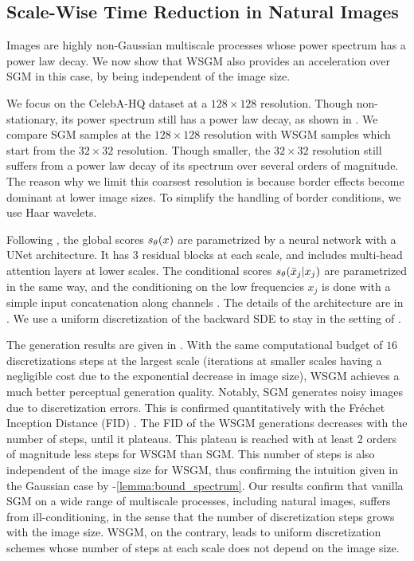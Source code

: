\documentclass{article}
\begin{document}
\subsection{Scale-Wise Time Reduction in Natural Images }

Images are highly non-Gaussian multiscale processes whose power spectrum has a power law decay. We now show that WSGM also provides an acceleration over SGM in this case, by being independent of the image size. 

We focus on the CelebA-HQ dataset \citep{liu2015faceattributes} at a $128\times 128$ resolution. Though non-stationary, its power spectrum still has a power law decay, as shown in . We compare SGM \cite{ho2020denoising} samples at the $128 \times 128$ resolution with WSGM samples which start from the $32 \times 32$ resolution. Though smaller, the $32 \times 32$ resolution still suffers from a power law decay of its spectrum over several orders of magnitude. The reason why we limit this coarsest resolution is because border effects become dominant at lower image sizes. To simplify the handling of border conditions, we use Haar wavelets. 

Following \cite{nichol2021improved}, the global scores ${s}_\theta(x)$ are parametrized by a neural network with a UNet architecture. It has 3 residual blocks at each scale, and includes multi-head attention layers at lower scales. The conditional scores ${s}_\theta(\bar x_j | x_j)$ are parametrized in the same way, and the conditioning on the low frequencies $x_j$ is done with a simple input concatenation along channels  \citep{nichol2021improved,saharia2021image}. The details of the architecture are in . We use a uniform discretization of the backward SDE to stay in the setting of . 

The generation results are given in . With the same computational budget of $16$ discretizations steps at the largest scale (iterations at smaller scales having a negligible cost due to the exponential decrease in image size), WSGM achieves a much better perceptual generation quality. Notably, SGM generates noisy images due to discretization errors. This is confirmed quantitatively with the Fréchet Inception Distance (FID) \citep{fid}. The FID of the WSGM generations decreases with the number of steps, until it plateaus. This plateau is reached with at least 2 orders of magnitude less steps for WSGM than SGM. This number of steps is also independent of the image size for WSGM, thus confirming the intuition given in the Gaussian case by -\ref{lemma:bound_spectrum}. Our results confirm that vanilla SGM on a wide range of multiscale processes, including natural images, suffers from ill-conditioning, in the sense that the number of discretization steps grows with the image size. WSGM, on the contrary, leads to uniform discretization schemes whose number of steps at each scale does not depend on the image size.
\end{document}
